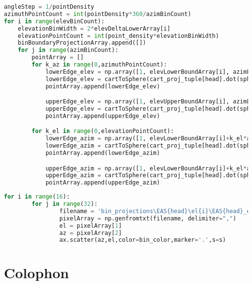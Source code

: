 \lstset{basicstyle=\tiny, style=myCustomMatlabStyle}
\begin{lstlisting}[language=Python]
angleStep = 1/pointDensity
azimuthPointCount = int(pointDensity*360/azimBinCount)
for i in range(elevBinCount):
    elevationBinWidth = 2*elevDeltaLowerArray[i]
    elevationPointCount = int(point_density*elevationBinWidth)
    binBoundaryProjectionArray.append([])
    for j in range(azimBinCount):
        pointArray = []
        for k_az in range(0,azimuthPointCount):
            lowerEdge_elev = np.array([1, elevLowerBoundArray[i], azimLowerBoundArray[j]+k_az*angleStep])
            lowerEdge_elev = cartToSphere(cart_proj_tuple[head].dot(sphereToCart(lowerEdge_elev)))
            pointArray.append(lowerEdge_elev)

            upperEdge_elev = np.array([1, elevUpperBoundArray[i], azimLowerBoundArray[j]+k_az*angleStep])
            upperEdge_elev = cartToSphere(cart_proj_tuple[head].dot(sphereToCart(upperEdge_elev)))
            pointArray.append(upperEdge_elev)

        for k_el in range(0,elevationPointCount):
            lowerEdge_azim = np.array([1, elevLowerBoundArray[i]+k_el*angleStep, azimLowerBoundArray[j]])
            lowerEdge_azim = cartToSphere(cart_proj_tuple[head].dot(sphereToCart(lowerEdge_azim)))
            pointArray.append(lowerEdge_azim)

            upperEdge_azim = np.array([1, elevLowerBoundArray[i]+k_el*angleStep, azimUpperBoundArray[j]])
            upperEdge_azim = cartToSphere(cart_proj_tuple[head].dot(sphereToCart(upperEdge_azim)))
            pointArray.append(upperEdge_azim)
\end{lstlisting}
\label{alg: pix point plot}

\lstset{basicstyle=\tiny, style=myCustomMatlabStyle}
\begin{lstlisting}[language=Python]
for i in range(16):
        for j in range(32):
                filename = 'bin_projections\EAS{head}\el{i}\EAS{head}_el{i}_az{j}.csv'
                pixelArray = np.genfromtxt(filename, delimiter=",")
                el = pixelArray[1]
                az = pixelArray[2]
                ax.scatter(az,el,color=bin_color,marker='.',s=s)
\end{lstlisting}
\label{alg: pix point save}


\chapter{Colophon}
\label{appendixlabel3}


